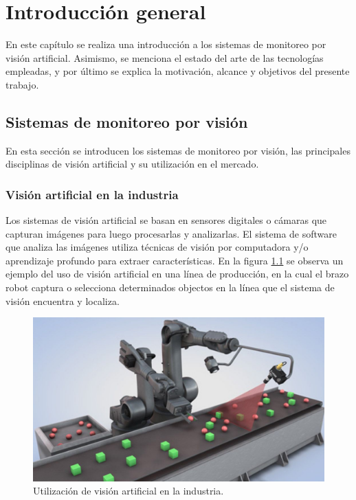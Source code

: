 
\chapter{Introducción general} %

\label{Chapter1} %
\label{IntroGeneral}

En este capítulo se realiza una introducción a los sistemas de monitoreo por visión artificial. Asimismo, se menciona el estado del arte de las tecnologías empleadas, y por último se explica la motivación, alcance y objetivos del presente trabajo.


\section{Sistemas de monitoreo por visión}
\label{sec:sistemasVision}

En esta sección se introducen los sistemas de monitoreo por visión, las principales disciplinas de visión artificial y su utilización en el mercado.

\subsection{Visión artificial en la industria}

Los sistemas de visión artificial se basan en sensores digitales o cámaras que capturan imágenes para luego procesarlas y analizarlas. El sistema de software que analiza las imágenes utiliza técnicas de visión por computadora y/o aprendizaje profundo para extraer características. En la figura \ref{fig:visionArtificial} se observa un ejemplo del uso de visión artificial en una línea de producción, en la cual el brazo robot captura o selecciona determinados objectos en la línea que el sistema de visión encuentra y localiza.

\begin{figure}[ht]
	\centering
	\includegraphics[scale=.55]{./Figures/visionArtificial.jpg}
	\caption{Utilización de visión artificial en la industria\protect\footnotemark.}
	\label{fig:visionArtificial}
\end{figure}

